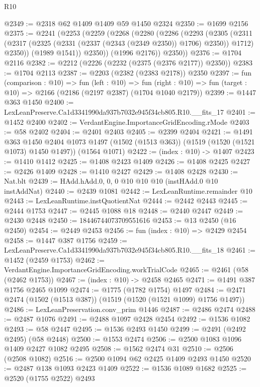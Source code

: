 \begin{lexlean}{R10}
\begin{coremodule}
@2349 := @2318 @62 @1409 @1409 @59 @1450 @2324
@2350 := @1699 @2156
@2375 := @2241
    (@2253
      (@2259
        (@2268
          (@2280
            (@2286
              (@2293
                (@2305
                  (@2311
                    (@2317 (@2325 (@2331 (@2337 (@2343 (@2349 @2350)) @1706) @2350)) @1712)
                    @2350))
                (@1989 @1541))
              @2350))
          (@1996 @2176))
        @2350))
@2376 := @1704 @2116
@2382 := @2212 (@2226 (@2232 (@2375 (@2376 @2177)) @2350))
@2383 := @1704 @2113
@2387 := @2203 (@2382 (@2383 @2178)) @2350
@2397 := fun (comparison : @10) =>
  fun (left : @10) =>
  fun (right : @10) => fun (target : @10) => @2166 (@2186 (@2197 @2387) (@1704 @1040 @2179))
@2399 := @1447 @363 @1450
@2400 := LexLeanPreserve.Ca1d3341990da937b7032e945f34cb805.R10.__fits_17
@2401 := @1452 @2400
@2402 := VerdantEngine.ImportanceGridEncoding.rMode
@2403 := @58 @2402
@2404 := @2401 @2403
@2405 := @2399 @2404
@2421 := @1491
    @363
    @1450
    @2404
    @1073
    @1497
    (@1502 (@1513 @363))
    (@1519 (@1520 (@1521 @1073) @1450 @1497))
    (@1564 @1071)
@2422 := (index : @10) -> @1407
@2423 := @1410 @1412
@2425 := @1408 @2423 @1409
@2426 := @1408 @2425
@2427 := @2426 @1409
@2428 := @1410 @2427
@2429 := @1408 @2428
@2430 := Nat.blt
@2439 := HAdd.hAdd.{0, 0, 0} @10 @10 @10 (instHAdd.{0} @10 instAddNat)
@2440 := @2439 @1081
@2442 := LexLeanRuntime.remainder @10
@2443 := LexLeanRuntime.instQuotientNat
@2444 := @2442 @2443
@2445 := @2444 @1753
@2447 := @2445 @1088 @18
@2448 := @2440 @2447
@2449 := @2430 @2448
@2450 := 18446744073709551616
@2453 := @13 @2450 (@16 @2450)
@2454 := @2449 @2453
@2456 := fun (index : @10) => @2429 @2454
@2458 := @1447 @387 @1756
@2459 := LexLeanPreserve.Ca1d3341990da937b7032e945f34cb805.R10.__fits_18
@2461 := @1452 (@2459 @1753)
@2462 := VerdantEngine.ImportanceGridEncoding.workTrialCode
@2465 := @2461 (@58 (@2462 @1753))
@2467 := (index : @10) -> @2458 @2465
@2471 := @1491 @387 @1756 @2465 @1099
@2474 := @1775 (@1782 @1754) @1497
@2484 := @2471 @2474 (@1502 (@1513 @387)) (@1519 (@1520 (@1521 @1099) @1756 @1497))
@2486 := LexLeanPreservation.conv_prim @1446
@2487 := @2486 @2474
@2488 := @2487 @1076
@2491 := @2488 @1097 @2428 @2454
@2492 := @1536 @1082
@2493 := @58 @2447
@2495 := @1536 @2493 @1450
@2499 := @2491 (@2492 @2495) (@58 @2448)
@2500 := @1553 @2474
@2506 := @2500 @1083 @1096 @1409 @2427 @1082 @2495
@2508 := @1562 @2474 @31
@2510 := @2506 (@2508 @1082)
@2516 := @2500 @1094 @62 @2425 @1409 @2493 @1450
@2520 := @2487 @138 @1093 @2423 @1409
@2522 := @1536 @1089 @1682
@2525 := @2520 (@1755 @2522) @2493

\end{coremodule}
\end{lexlean}
